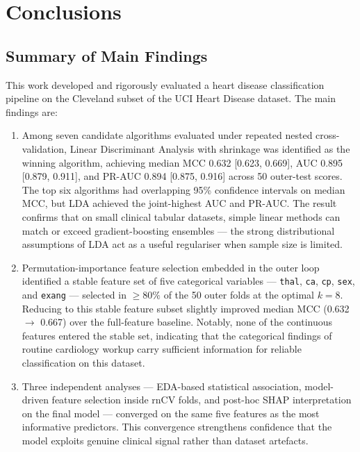 \section{Conclusions}
\label{sec:conclusions}

\subsection{Summary of Main Findings}

This work developed and rigorously evaluated a heart disease classification pipeline on the Cleveland subset of the UCI Heart Disease dataset. The main findings are:

\begin{enumerate}
    \item Among seven candidate algorithms evaluated under repeated nested cross-validation, Linear Discriminant Analysis with shrinkage was identified as the winning algorithm, achieving median MCC 0.632 [0.623, 0.669], AUC 0.895 [0.879, 0.911], and PR-AUC 0.894 [0.875, 0.916] across 50 outer-test scores. The top six algorithms had overlapping 95\% confidence intervals on median MCC, but LDA achieved the joint-highest AUC and PR-AUC. The result confirms that on small clinical tabular datasets, simple linear methods can match or exceed gradient-boosting ensembles --- the strong distributional assumptions of LDA act as a useful regulariser when sample size is limited.

    \item Permutation-importance feature selection embedded in the outer loop identified a stable feature set of five categorical variables --- \texttt{thal}, \texttt{ca}, \texttt{cp}, \texttt{sex}, and \texttt{exang} --- selected in $\geq 80\%$ of the 50 outer folds at the optimal $k = 8$. Reducing to this stable feature subset slightly improved median MCC (0.632 $\to$ 0.667) over the full-feature baseline. Notably, none of the continuous features entered the stable set, indicating that the categorical findings of routine cardiology workup carry sufficient information for reliable classification on this dataset.

    \item Three independent analyses --- EDA-based statistical association, model-driven feature selection inside rnCV folds, and post-hoc SHAP interpretation on the final model --- converged on the same five features as the most informative predictors. This convergence strengthens confidence that the model exploits genuine clinical signal rather than dataset artefacts.


\end{enumerate}
